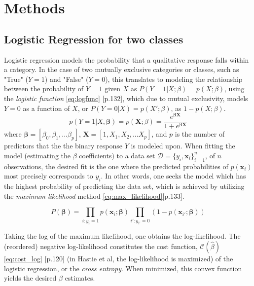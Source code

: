 \documentclass[%
oneside,                 %
final,                   %
10pt]{article}
\begin{document}
\section{Methods} \label{Section_Theory}

\subsection{Logistic Regression for two classes} \label{Section_M_Logreg}
Logistic regression models the probability that a qualitative response falls within a category. In the case of two mutually exclusive categories or classes, such as "True" ($Y=1$) and "False" ($Y=0$), this translates to modeling the relationship between the probability of $Y=1$ given $X$ as $P(Y=1|X;\beta)=p(X;\beta)$, using the \textit{logistic function} \eqref{eq:logfunc} \citep{2017introstatlearn}[p.132], which due to mutual exclusivity, models $Y=0$ as a function of $X$, or $P(Y=0|X)=p(X';\beta)$, as $1-p(X;\beta)$.
\begin{equation}
p(Y=1|X, \bm{\beta})= p(\bm{X};{\beta})=\frac{e^{\bm{\beta}\bm{X}}}{1+e^{\bm{\beta}\bm{X}}}
\label{eq:logfunc}
\end{equation}
where $\bm{\beta}=[\beta_0, \beta_1, ... \beta_p]$, $\bm{X}=[1,X_1, X_2, ... X_p]$, and $p$ is the number of predictors that the the binary response $Y$ is modeled upon. When fitting the model (estimating the $\beta$ coefficients) to a data set $\mathcal{D}=\{y_i,\bm{x}_i\}_{i=1}^n$, of $n$ observations, the desired fit is the one where the predicted probabilities of $p(\bm{x}_i)$  most precisely corresponds to $y_i$. In other words, one seeks the model which has the highest probability of predicting the data set, which is achieved by utilizing the \textit{maximum likelihood} method \eqref{eq:max_likelihood}\citep{2017introstatlearn}[p.133]. 



\begin{equation}
P(\bm{\beta})=\displaystyle\prod_{i:y_i=1}p(\bm{x}_i; \bm{\beta}) \displaystyle\prod_{i':y_{i'}=0}(1-p(\bm{x}_{i'}; \bm{\beta}))
\label{eq:max_likelihood}
\end{equation}

Taking the log of the maximum likelihood, one obtains the log-likelihood. The (reordered) negative log-likelihood constitutes the cost function, $\mathcal{C}(\hat {{\beta}})$ \eqref{eq:cost_log} \citep{HastieTrevor2009TEoS}[p.120] (in Hastie et al, the log-likelihood is maximized) of the logistic regression, or the \textit{cross entropy}. When minimized, this convex function yields the desired $\beta$ estimates.
\end{document}
